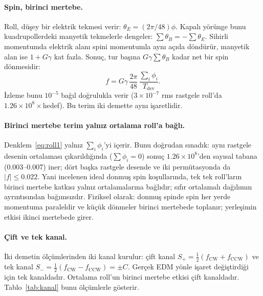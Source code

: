 \documentclass[12pt,a4paper]{extarticle}
\begin{document}
\paragraph{Spin, birinci mertebe.} Roll, düşey bir elektrik tekmesi verir: $\theta_E=(2\pi/48)\phi$. Kapalı
yörünge bunu kuadrupollerdeki manyetik tekmelerle dengeler: $\sum\theta_B=-\sum\theta_E$. Sihirli momentumda
elektrik alanı spini momentumla aynı açıda döndürür, manyetik alan ise $1+G\gamma$ kat fazla. Sonuç, tur başına
$G\gamma\sum\theta_B$ kadar net bir spin dönmesidir:
\begin{equation}
f=G\gamma\,\frac{2\pi}{48}\,\frac{\sum_i\phi_i}{T_\text{dev}}.
\label{eq:roll1}
\end{equation}
İzleme bunu $10^{-5}$ bağıl doğrulukla verir ($3\times10^{-7}$ rms rastgele roll'da $1.26\times10^8\times$hedef).
Bu terim iki demette aynı işaretlidir.

\paragraph{Birinci mertebe terim yalnız ortalama roll'a bağlı.} Denklem~\eqref{eq:roll1} yalnız $\sum_i\phi_i$'yi
içerir. Bunu doğrudan sınadık: aynı rastgele desenin ortalaması çıkarıldığında ($\sum\phi_i=0$) sonuç
$1.26\times10^8$'den sayısal tabana (0.003--0.007) iner; dört başka rastgele desende ve iki permütasyonda da
$|f|\le0.022$. Yani incelenen ideal donmuş spin koşullarında, tek tek roll'ların birinci mertebe katkısı yalnız
ortalamalarına bağlıdır; sıfır ortalamalı dağılımın ayrıntısından bağımsızdır. Fiziksel olarak: donmuş spinde spin
her yerde momentuma paraleldir ve küçük dönmeler birinci mertebede toplanır; yerleşimin etkisi ikinci mertebede
girer.

\paragraph{Çift ve tek kanal.} İki demetin ölçümlerinden iki kanal kurulur: çift kanal
$S_+=\tfrac12(f_\text{CW}+f_\text{CCW})$ ve tek kanal $S_-=\tfrac12(f_\text{CW}-f_\text{CCW})=\pm C$. Gerçek EDM
yönle işaret değiştirdiği için tek kanaldadır. Ortalama roll'un birinci mertebe etkisi çift kanaldadır.
Tablo~\ref{tab:kanal} bunu ölçümlerle gösterir.
\end{document}
